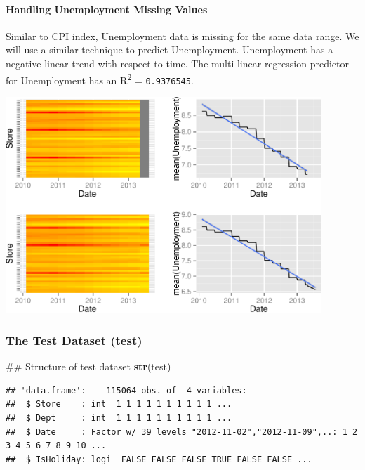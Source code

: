 \documentclass[]{article}
\newenvironment{Shaded}{\begin{snugshade}}{\end{snugshade}}
\newcommand{\KeywordTok}[1]{\textcolor[rgb]{0.13,0.29,0.53}{\textbf{{#1}}}}
\newcommand{\NormalTok}[1]{{#1}}
\begin{document}
\paragraph{Handling Unemployment Missing
Values}\label{handling-unemployment-missing-values}

Similar to CPI index, Unemployment data is missing for the same data
range. We will use a similar technique to predict Unemployment.
Unemployment has a negative linear trend with respect to time. The
multi-linear regression predictor for Unemployment has an
R\textsuperscript{2} = \texttt{0.9376545}.

\includegraphics[width=450px]{PredictingWeeklySalesAtWalmart_files/figure-latex/graphingUnemploymentPrediction-1}

\subsubsection{The Test Dataset (test)}\label{the-test-dataset-test}

\begin{Shaded}
\begin{Highlighting}[]
\NormalTok{## Structure of test dataset}
\KeywordTok{str}\NormalTok{(test)}
\end{Highlighting}
\end{Shaded}

\begin{verbatim}
## 'data.frame':    115064 obs. of  4 variables:
##  $ Store    : int  1 1 1 1 1 1 1 1 1 1 ...
##  $ Dept     : int  1 1 1 1 1 1 1 1 1 1 ...
##  $ Date     : Factor w/ 39 levels "2012-11-02","2012-11-09",..: 1 2 3 4 5 6 7 8 9 10 ...
##  $ IsHoliday: logi  FALSE FALSE FALSE TRUE FALSE FALSE ...
\end{verbatim}
\end{document}
